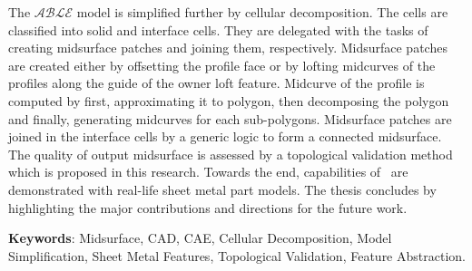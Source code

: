 The $\mathcal{ABLE}$ model is simplified further by cellular decomposition. The cells are classified into solid and interface cells. They are delegated with the tasks of creating midsurface patches and joining them, respectively. Midsurface patches are created either by offsetting the profile face or by lofting midcurves of the profiles along the guide of the owner loft feature. Midcurve of the profile is computed by first, approximating it to polygon, then decomposing the polygon and finally, generating midcurves for each sub-polygons. Midsurface patches are joined in the interface cells by a generic logic to form a connected midsurface. The quality of output midsurface is assessed by a topological validation method which is proposed in this research. Towards the end, capabilities of \mysystemname~are demonstrated with real-life sheet metal part models. The thesis concludes by highlighting the major contributions and directions for the future work.



\bigskip

{\bf Keywords}:  Midsurface, CAD, CAE, Cellular Decomposition, Model Simplification, Sheet Metal Features, Topological Validation, Feature Abstraction.
